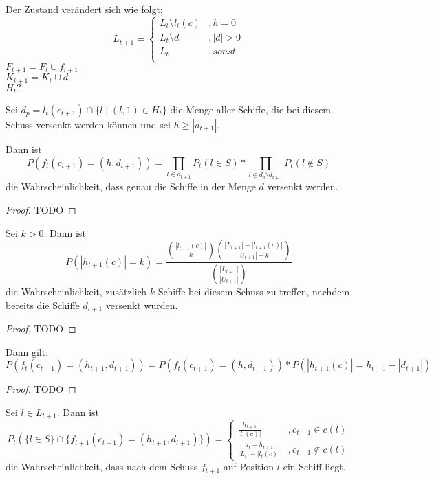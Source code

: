 \documentclass[a4paper,12pt]{llncs}
\numberwithin{equation}{section}
\begin{document}
Der Zustand verändert sich wie folgt: \\
\[
L_{t+1}=
\begin{cases} 
      L_t \setminus l_t(c) &, h=0 \\
      L_t \setminus d &, |d|>0 \\
      L_t &, sonst \\
\end{cases}
\]
$F_{t+1}=F_t \cup f_{t+1}$ \\
$K_{t+1}=K_t \cup d$ \\
$H_t?$


\begin{lemma}
Sei $d_p=l_t(c_{t+1}) \cap \{l \mid (l, 1) \in H_t\}$ die Menge aller Schiffe, die bei diesem Schuss versenkt werden können und sei $h \geq |d_{t+1}|$.

Dann ist
\[
P(f_t(c_{t+1})=(h, d_{t+1}))=\prod_{l \in d_{t+1}}P_t(l \in S) * \prod_{l \in d_p \setminus d_{t+1}}P_t(l \notin S)
\]
die Wahrscheinlichkeit, dass genau die Schiffe in der Menge $d$ versenkt werden.
\end{lemma}

\begin{proof}
TODO
\end{proof}


\begin{lemma}
Sei $k >0$.
Dann ist
\[
P(|h_{t+1}(c)|=k)=\frac{\binom{|l_{t+1}(c)|}{k} \binom{|L_{t+1}| - |l_{t+1}(c)|}{|U_{t+1}|-k}}{\binom{|L_{t+1}|}{|U_{t+1}|}}
\]
die Wahrscheinlichkeit, zusätzlich $k$ Schiffe bei diesem Schuss zu treffen, nachdem bereits die Schiffe $d_{t+1}$ versenkt wurden.
\end{lemma}

\begin{proof}
TODO
\end{proof}


\begin{lemma}
Dann gilt:
\[
P(f_t(c_{t+1})=(h_{t+1}, d_{t+1}))=P(f_t(c_{t+1})=(h, d_{t+1})) * P(|h_{t+1}(c)|=h_{t+1}-|d_{t+1}|)
\]
\end{lemma}

\begin{proof}
TODO
\end{proof}


\begin{lemma}
Sei $l \in L_{t+1}$.
Dann ist
\[
P_t(\{l \in S\} \cap \{f_{t+1}(c_{t+1})=(h_{t+1}, d_{t+1})\})=
\begin{cases} 
      \frac{h_{t+1}}{|l_t(c)|} &, c_{t+1} \in c(l) \\
      \frac{u_t-h_{t+1}}{|L_t|-|l_t(c)|} &, c_{t+1} \notin c(l)
\end{cases}
\]
die Wahrscheinlichkeit, dass nach dem Schuss $f_{t+1}$ auf Position $l$ ein Schiff liegt.
\end{lemma}
\end{document}
